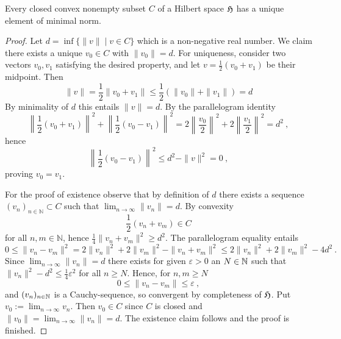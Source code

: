 \begin{theorem} 
   Every closed convex nonempty subset $C$ of a Hilbert space 
   $\mathfrak{H}$ has a unique element of minimal norm.
\end{theorem}
\begin{proof}
Let $d = \inf\{ \|v\| \mid v \in C \}$ which is a non-negative real number. We claim there exists a unique 
$v_0 \in C$ with $\|v_0\| =d$. 
For uniqueness, consider two vectors $v_0, v_1$ satisfying the desired property, and let $v = \frac{1}{2}(v_0 + v_1)$ 
be their midpoint. Then
\begin{equation*}
  \|v\| = \frac{1}{2}\|v_0 + v_1\| \leq \frac{1}{2}(\|v_0\| + \|v_1\|) = d
\end{equation*}
By minimality of $d$ this entails $\|v\| =d$. By the parallelogram identity
\begin{equation*}
    \left\|\frac{1}{2} (v_0 + v_1)\right\|^2 + \left\|\frac{1}{2}(v_0 - v_1) \right\|^2  = 
    2\left\|\frac{v_0}{2}\right\|^2 + 2\left\|\frac{v_1}{2}\right\|^2 = d^2 \ ,
\end{equation*}
hence
\[
\left\| \frac{1}{2} (v_0 - v_1) \right\|^2 \leq d^2 - \|v\|^2 = 0 \ ,
\]
proving $v_0 = v_1$. 

For the proof of existence observe that by definition of $d$ there exists a sequence $(v_n)_{n \in \mathbb{N}} \subset C$ such 
that $\lim_{n \to \infty}\|v_n \| = d$. By convexity
\[
   \frac{1}{2}(v_n + v_m) \in C
\]
for all $n,m \in \mathbb{N}$, hence $\frac{1}{4}\|v_n + v_m \|^2 \geq d^2$. The parallelogram equality entails
\[
0 \leq \| v_n - v_m \|^2 = 2\|v_n \|^2 + 2\|v_m \|^2 - \| v_n + v_m \|^2 \leq 2\|v_n \|^2 + 2\|v_m \|^2 - 4d^2 \ .
\]
Since $\lim_{n \to \infty}\|v_n \| = d$ there exists for given $\varepsilon >0$ an $N\in \mathbb{N}$ such that 
$ \|v_n \|^2 -d^2 \leq \frac 14 \varepsilon^2 $ for all $n \geq N$. Hence, for $n,m \geq N$
\[
  0 \leq \| v_n - v_m \| \leq \varepsilon \ ,
\] 
and $(v_n)_{n \in \mathbb{N}}$ is a Cauchy-sequence, so convergent by completeness of $\mathfrak{H}$. Put $v_0:= \lim_{n \to \infty}v_n$. 
Then $v_0 \in C$ since $C$ is closed and $\|v_0 \|=\lim_{n \to \infty}\|v_n \| = d$. The existence claim follows 
and the proof is finished.
\end{proof}

